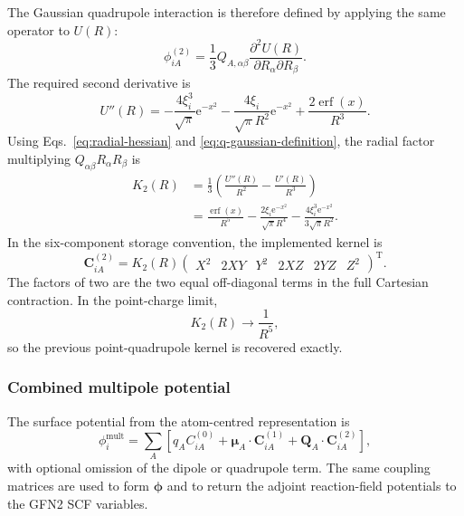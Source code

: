 \documentclass[11pt,a4paper]{article}
\newcommand{\vect}[1]{\bm{#1}}
\newcommand{\erf}{\operatorname{erf}}
\newcommand{\ee}{\mathrm{e}}
\begin{document}
The Gaussian quadrupole interaction is therefore defined by applying the same
operator to $U(R)$:
\begin{equation}
 \phi_{iA}^{(2)}=
 \frac13Q_{A,\alpha\beta}
 \frac{\partial^2U(R)}{\partial R_\alpha\partial R_\beta}.
 \label{eq:q-gaussian-definition}
\end{equation}
The required second derivative is
\begin{equation}
 U''(R)=
 -\frac{4\xi_i^3}{\sqrt\pi}\ee^{-x^2}
 -\frac{4\xi_i}{\sqrt\pi R^2}\ee^{-x^2}
 +\frac{2\erf(x)}{R^3}.
\end{equation}
Using Eqs.~\eqref{eq:radial-hessian} and
\eqref{eq:q-gaussian-definition}, the radial factor multiplying
$Q_{\alpha\beta}R_\alpha R_\beta$ is
\begin{align}
 K_2(R)
 &=\frac13\left(\frac{U''(R)}{R^2}
                 -\frac{U'(R)}{R^3}\right)\\
 &=\frac{\erf(x)}{R^5}
 -\frac{2\xi_i\ee^{-x^2}}{\sqrt\pi R^4}
 -\frac{4\xi_i^3\ee^{-x^2}}{3\sqrt\pi R^2}.
 \label{eq:k2}
\end{align}
In the six-component storage convention, the implemented kernel is
\begin{equation}
 \vect C_{iA}^{(2)}=K_2(R)
 \begin{pmatrix}
 X^2 & 2XY & Y^2 & 2XZ & 2YZ & Z^2
 \end{pmatrix}^{\mathrm T}.
\end{equation}
The factors of two are the two equal off-diagonal terms in the full Cartesian
contraction.  In the point-charge limit,
\begin{equation}
 K_2(R)\longrightarrow\frac1{R^5},
\end{equation}
so the previous point-quadrupole kernel is recovered exactly.

\subsubsection*{Combined multipole potential}

The surface potential from the atom-centred representation is
\begin{equation}
 \phi_i^{\mathrm{mult}}=\sum_A\left[
 q_AC_{iA}^{(0)}
 +\vect\mu_A\mathbin{\cdot}\vect C_{iA}^{(1)}
 +\vect Q_A\mathbin{\cdot}\vect C_{iA}^{(2)}
 \right],
 \label{eq:multipole-potential}
\end{equation}
with optional omission of the dipole or quadrupole term.  The same coupling
matrices are used to form $\vect\phi$ and to return the adjoint reaction-field
potentials to the GFN2 SCF variables.
\end{document}
